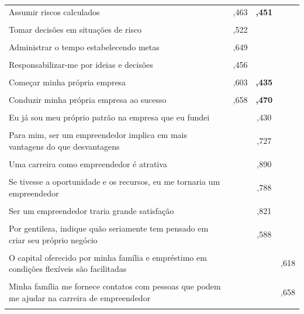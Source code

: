 \begin{apendicesenv}
\begin{longtable}[H]{p{6cm} c c c }
Assumir riscos calculados
 &   ,463 & \textbf{,451} & \\\\
 
Tomar decisões em situações de risco
 &   ,522 & & \\\\
 
Administrar o tempo estabelecendo metas
 &   ,649 & & \\\\
 
Responsabilizar-me por ideias e decisões
 & ,456 & &  \\\\
 
Começar minha própria empresa
& ,603 & \textbf{,435}  & \\\\

Conduzir minha própria empresa ao sucesso
 & ,658 & \textbf{,470}  & \\\\
Eu já sou meu próprio patrão na empresa que eu fundei
 & & ,430 &  \\\\

Para mim, ser um empreendedor implica em mais vantagens do que desvantagens
 &  & ,727  & \\\\
 
Uma carreira como empreendedor é atrativa
 &  & ,890  & \\\\
 
Se tivesse a oportunidade e os recursos, eu me tornaria um empreendedor
 &  & ,788 & \\\\
 
Ser um empreendedor traria grande satisfação
 &  & ,821 & \\\\
 
Por gentileza, indique quão seriamente tem pensado em criar seu próprio negócio
 &  & ,588 & \\\\
 
O capital oferecido por minha família e empréstimo em condições flexíveis são facilitadas
 &  & & ,618 \\\\
 
Minha família me fornece contatos com pessoas que podem me ajudar na carreira de empreendedor
 &  & & ,658 \\\\
 

\end{longtable}
\end{apendicesenv}
